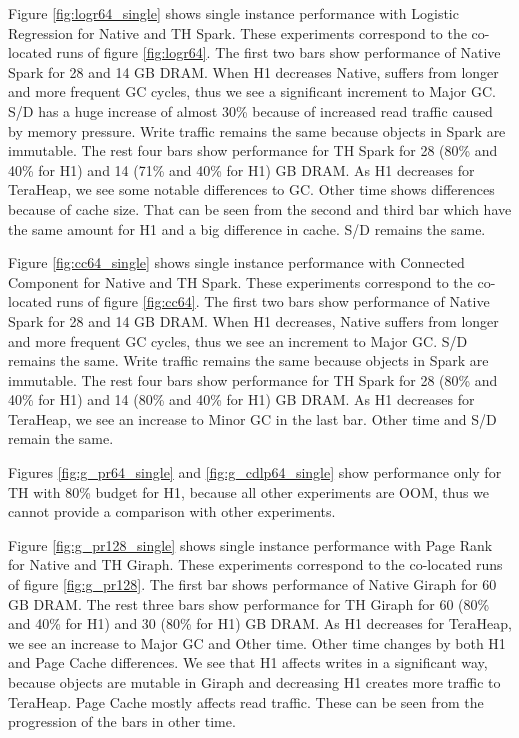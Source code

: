 Figure \ref{fig:logr64_single} shows single instance performance with Logistic Regression for Native and TH Spark. These experiments correspond to the co-located runs of figure \ref{fig:logr64}. The first two bars show performance of Native Spark for 28 and 14 GB DRAM. When H1 decreases Native, suffers from longer and more frequent GC cycles, thus we see a significant increment to Major GC. S/D has a huge increase of almost 30\% because of increased read traffic caused by memory pressure. Write traffic remains the same because objects in Spark are immutable. The rest four bars show performance for TH Spark for 28 (80\% and 40\% for H1) and 14 (71\% and 40\% for H1) GB DRAM. As H1 decreases for TeraHeap, we see some notable differences to GC. Other time shows differences because of cache size. That can be seen from the second and third bar which have the same amount for H1 and a big difference in cache. S/D remains the same.

Figure \ref{fig:cc64_single} shows single instance performance with Connected Component for Native and TH Spark. These experiments correspond to the co-located runs of figure \ref{fig:cc64}. The first two bars show performance of Native Spark for 28 and 14 GB DRAM. When H1 decreases, Native suffers from longer and more frequent GC cycles, thus we see an increment to Major GC. S/D remains the same. Write traffic remains the same because objects in Spark are immutable. The rest four bars show performance for TH Spark for 28 (80\% and 40\% for H1) and 14 (80\% and 40\% for H1) GB DRAM. As H1 decreases for TeraHeap, we see an increase to Minor GC in the last bar. Other time and S/D remain the same.

Figures \ref{fig:g_pr64_single} and \ref{fig:g_cdlp64_single} show performance only for TH with 80\% budget for H1, because all other experiments are OOM, thus  we cannot provide a comparison with other experiments.

Figure \ref{fig:g_pr128_single} shows single instance performance with Page Rank for Native and TH Giraph. These experiments correspond to the co-located runs of figure \ref{fig:g_pr128}. The first bar shows performance of Native Giraph for 60 GB DRAM. The rest three bars show performance for TH Giraph for 60 (80\% and 40\% for H1) and 30 (80\% for H1) GB DRAM. As H1 decreases for TeraHeap, we see an increase to Major GC  and Other time. Other time changes by both H1 and Page Cache differences. We see that H1 affects writes in a significant way, because objects are mutable in Giraph and decreasing H1 creates more traffic to TeraHeap. Page Cache mostly affects read traffic. These can be seen from the progression of the bars in other time.


